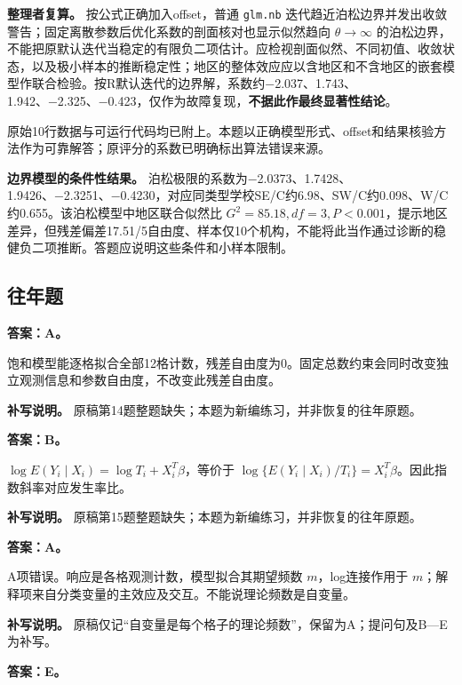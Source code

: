 \textbf{整理者复算。} 按公式正确加入offset，普通 \texttt{glm.nb} 迭代趋近泊松边界并发出收敛警告；固定离散参数后优化系数的剖面核对也显示似然趋向 \(\theta\to\infty\) 的泊松边界，不能把原默认迭代当稳定的有限负二项估计。应检视剖面似然、不同初值、收敛状态，以及极小样本的推断稳定性；地区的整体效应应以含地区和不含地区的嵌套模型作联合检验。按R默认迭代的边界解，系数约−2.037、1.743、1.942、−2.325、−0.423，仅作为故障复现，\textbf{不据此作最终显著性结论}。

原始10行数据与可运行代码均已附上。本题以正确模型形式、offset和结果核验方法作为可靠解答；原评分的系数已明确标出算法错误来源。

\textbf{边界模型的条件性结果。} 泊松极限的系数为−2.0373、1.7428、1.9426、−2.3251、−0.4230，对应同类型学校SE/C约6.98、SW/C约0.098、W/C约0.655。该泊松模型中地区联合似然比 \(G^2=85.18,df=3,P<0.001\)，提示地区差异，但残差偏差17.51/5自由度、样本仅10个机构，不能将此当作通过诊断的稳健负二项推断。答题应说明这些条件和小样本限制。


\subsection{往年题}


\textbf{答案：A。}

饱和模型能逐格拟合全部12格计数，残差自由度为0。固定总数约束会同时改变独立观测信息和参数自由度，不改变此残差自由度。

\textbf{补写说明。} 原稿第14题整题缺失；本题为新编练习，并非恢复的往年原题。



\textbf{答案：B。}

\(\log E(Y_i\mid X_i)=\log T_i+X_i^T\beta\)，等价于 \(\log\{E(Y_i\mid X_i)/T_i\}=X_i^T\beta\)。因此指数斜率对应发生率比。

\textbf{补写说明。} 原稿第15题整题缺失；本题为新编练习，并非恢复的往年原题。



\textbf{答案：A。}

A项错误。响应是各格观测计数，模型拟合其期望频数 \(m\)，log连接作用于 \(m\)；解释项来自分类变量的主效应及交互。不能说理论频数是自变量。

\textbf{补写说明。} 原稿仅记``自变量是每个格子的理论频数''，保留为A；提问句及B---E为补写。



\textbf{答案：E。}

